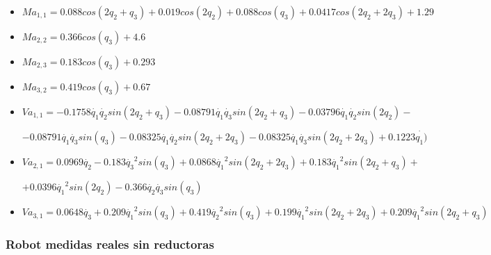 \begin{itemize}
	
	\item $ Ma_{1,1}=0.088cos(2q_2 + q_3) + 0.019cos(2q_2) + 0.088cos(q_3) + 0.0417cos(2q_{2} + 2q_{3}) + 1.29$ \\ \vspace{0.2cm}
	
	\item $ Ma_{2,2}= 0.366cos(q_3) + 4.6$ \\ \vspace{0.2cm}
	
	\item $ Ma_{2,3}=0.183cos(q_3) + 0.293$ \\ \vspace{0.2cm}
	
	\item $ Ma_{3,2}=  0.419cos(q_3) + 0.67$ \\ \vspace{0.2cm}
	
	\item $ Va_{1,1}=-0.1758\dot{q_1}\dot{q_2}sin(2q_2 + q_3) - 0.08791\dot{q_1}\dot{q_3}sin(2q_2 + q_3) - 0.03796\dot{q_1}\dot{q_2}sin(2q_2) -$ \\ \vspace{0.1cm}
	
	$ - 0.08791\dot{q_1}\dot{q_3}sin(q_3) - 0.08325\dot{q_1}\dot{q_2}sin(2q_2 + 2q_3) - 0.08325\dot{q_1}\dot{q_3}sin(2q_2 + 2q_3) + 0.1223\dot{q_1)}$ \\ \vspace{0.2cm}
	
	\item $ Va_{2,1}=0.0969\dot{q_2} - 0.183\dot{q_3}^{2}sin(q_3) + 0.0868\dot{q_1}^{2}sin(2q_{2} + 2q_{3}) + 0.183\dot{q_1}^{2}sin(2q_2 + q_3) + $ \\ \vspace{0.1cm}
	
	$ + 0.0396\dot{q_1}^{2}sin(2q_{2}) - 0.366\dot{q_2}\dot{q_3}sin(q_3) $\\ \vspace{0.2cm}
	
	\item $ Va_{3,1}=0.0648\dot{q_3} + 0.209\dot{q_1}^{2}sin(q_3) + 0.419\dot{q_2}^{2}sin(q_3) + 0.199\dot{q_1}^{2}sin(2q_2 + 2q_3) + 0.209\dot{q_1}^{2}sin(2q_2 + q_3) $
	
\end{itemize}


\subsubsection{Robot medidas reales sin reductoras}

